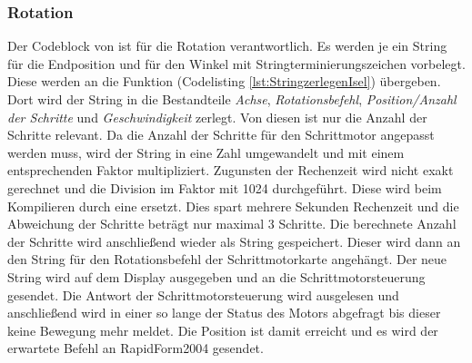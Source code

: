 \subsubsection{Rotation}
Der Codeblock von  ist für die Rotation verantwortlich. Es werden je ein String für die Endposition und für den Winkel mit Stringterminierungszeichen vorbelegt. Diese werden an die Funktion \linebreak {} (Codelisting \ref{lst:StringzerlegenIsel}) übergeben. Dort wird der String in die Bestandteile \emph{Achse}, \emph{Rotationsbefehl}, \emph{Position/Anzahl der Schritte} und \emph{Geschwindigkeit} zerlegt. Von diesen ist nur die Anzahl der Schritte relevant. Da die Anzahl der Schritte für den Schrittmotor angepasst werden muss, wird der String in eine Zahl umgewandelt und mit einem entsprechenden Faktor multipliziert. Zugunsten der Rechenzeit wird nicht exakt gerechnet und die Division im Faktor mit 1024 durchgeführt. Diese wird beim Kompilieren durch eine  ersetzt. Dies spart mehrere Sekunden Rechenzeit und die Abweichung der Schritte beträgt nur maximal 3 Schritte. Die berechnete Anzahl der Schritte wird anschließend wieder als String gespeichert. Dieser wird dann an den String für den Rotationsbefehl der Schrittmotorkarte angehängt. Der neue String wird auf dem Display ausgegeben und an die Schrittmotorsteuerung gesendet. Die Antwort der Schrittmotorsteuerung wird ausgelesen und anschließend wird in einer  so lange der Status des Motors abgefragt bis dieser keine Bewegung mehr meldet. Die Position ist damit erreicht und es wird der erwartete Befehl an RapidForm2004 gesendet.
\lstset{language=C, basicstyle=\footnotesize, showstringspaces=false, tabsize=8}

\lstset{language=C, basicstyle=\footnotesize, showstringspaces=false, tabsize=8}



